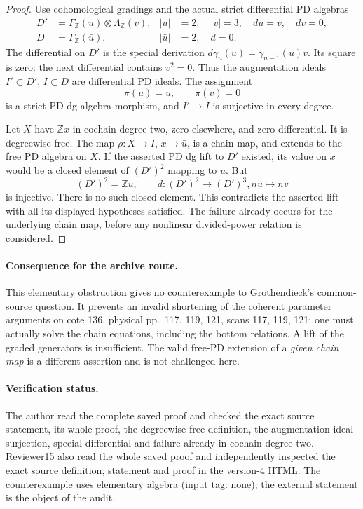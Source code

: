 \begin{proof}
Use cohomological gradings and the actual strict differential
PD algebras
\[
 \begin{aligned}
 D'&=\Gamma_{\mathbb Z}(u)\otimes\Lambda_{\mathbb Z}(v),
       &|u|&=2,\quad |v|=3,\quad du=v,\quad dv=0,\\
 D&=\Gamma_{\mathbb Z}(\bar u),
       &|\bar u|&=2,\quad d=0.
 \end{aligned}
                                                        \tag{136.FL1}
\]
The differential on \(D'\) is the special derivation
\(d\gamma_n(u)=\gamma_{n-1}(u)v\). Its square is zero:
the next differential contains \(v^2=0\). Thus the
augmentation ideals \(I'\subset D'\), \(I\subset D\)
are differential PD ideals. The assignment
\[
                       \pi(u)=\bar u,\qquad\pi(v)=0
                                                        \tag{136.FL2}
\]
is a strict PD dg algebra morphism, and \(I'\to I\)
is surjective in every degree.

Let \(X\) have \(\mathbb Z x\) in cochain degree two,
zero elsewhere, and zero differential. It is degreewise free.
The map \(\rho:X\to I\), \(x\mapsto\bar u\), is
a chain map, and extends to the free PD algebra on \(X\).
If the asserted PD dg lift to \(D'\) existed, its value
on \(x\) would be a closed element of \((D')^2\)
mapping to \(\bar u\). But
\[
                   (D')^2=\mathbb Z u,
                   \qquad d:(D')^2\to(D')^3,
                                      nu\longmapsto nv
                                                        \tag{136.FL3}
\]
is injective. There is no such closed element. This contradicts
the asserted lift with all its displayed hypotheses satisfied.
The failure already occurs for the underlying chain map, before
any nonlinear divided-power relation is considered.
\end{proof}

\paragraph{Consequence for the archive route.}
This elementary obstruction gives no counterexample to
Grothendieck's common-source question. It prevents an invalid
shortening of the coherent parameter arguments on cote 136,
physical pp.~117, 119, 121, scans 117, 119, 121: one must actually
solve the chain equations, including the bottom relations.
A lift of the graded generators is insufficient.
The valid free-PD extension of a \emph{given chain map} is a
different assertion and is not challenged here.

\paragraph{Verification status.}
The author read the complete saved proof and checked the exact
source statement, its whole proof, the degreewise-free definition,
the augmentation-ideal surjection, special differential and
failure already in cochain degree two. Reviewer15 also read the
whole saved proof and independently inspected the exact source
definition, statement and proof in the version-4 HTML. The
counterexample uses elementary algebra (input
tag: none); the external statement is the object of the audit.
